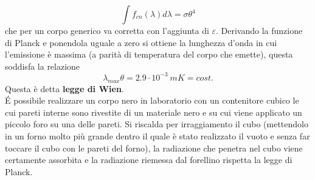 \documentclass[
10pt, %
a4paper, %
oneside, %
headinclude,footinclude, %
BCOR5mm, %
]{scrartcl}
\begin{document}
\[\int f_{cn}(\lambda)d\lambda = \sigma \theta^4\]
che per un corpo generico va corretta con l'aggiunta di $\varepsilon$. Derivando la funzione di Planck e ponendola uguale a zero si ottiene la lunghezza d'onda in cui l'emissione è massima (a parità di temperatura del corpo che emette), questa soddisfa la relazione
\[\lambda_{max} \theta= 2.9 \cdot 10^{-3}\ m K =cost.\] 
Questa è detta \textbf{legge di Wien}.\\
\'{E} possibile realizzare un corpo nero in laboratorio con un contenitore cubico le cui pareti interne sono rivestite di un materiale nero e su cui viene applicato un piccolo foro su una delle pareti. Si riscalda per irraggiamento il cubo (mettendolo in un forno molto più grande dentro il quale è stato realizzato il vuoto e senza far toccare il cubo con le pareti del forno), la radiazione che penetra nel cubo viene certamente assorbita e la radiazione riemessa dal forellino rispetta la legge di Planck. 
\end{document}
